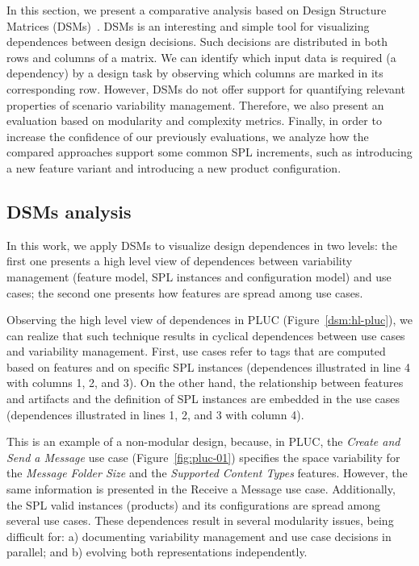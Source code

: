 \documentclass{acm_proc_article-sp}
\begin{document}
In this section, 
we present a comparative analysis based on Design Structure Matrices (DSMs)~\cite{clark-design-rules-book}. 
DSMs is an interesting and simple tool for visualizing dependences between design decisions. Such decisions are distributed in both rows and columns of a matrix. We can identify which input data is required (a dependency) by a design task by observing which columns are marked in its corresponding row. However, DSMs do not offer support for 
quantifying relevant properties of scenario variability management. Therefore, we also present an evaluation based on modularity and 
complexity metrics. Finally, in order to increase the confidence of our previously evaluations, we analyze how the compared approaches support 
some common SPL increments, such as introducing a new feature variant and introducing a new product configuration. 

\subsection{DSMs analysis}
\label{dsm-analysis}

In this work, we apply DSMs to visualize 
design dependences in two levels: the first one presents a high level view of dependences between variability
management (feature model, SPL instances and configuration model) and use cases; the second
one presents how features are spread among use cases. 

Observing the high level view of dependences in PLUC (Figure~\ref{dsm:hl-pluc}),  
we can realize that such technique results in cyclical dependences between use cases and variability
management. First, use cases refer to tags that are computed based on features and on specific 
SPL instances (dependences illustrated in line 4 with columns 1, 2, and 3). On the other hand, the relationship between 
features and artifacts and the definition of SPL instances are embedded in the use cases (dependences illustrated in lines 1, 2, 
and 3 with column 4). 

This is an example of a non-modular design, because, in PLUC,
the \emph{Create and Send a Message} use case (Figure~\ref{fig:pluc-01})
specifies the space variability for the \emph{Message Folder Size} and the \emph{Supported Content
Types} features. However, the same information is presented in the Receive a Message use case.
Additionally, the SPL valid instances (products) and its configurations are spread among
several use cases. These dependences result in several modularity issues, being difficult for: a) documenting variability
management and use case decisions in parallel; and b) evolving both representations independently.
\end{document}
